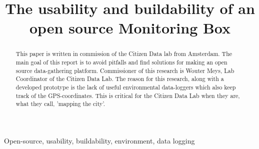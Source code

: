 \documentclass[conference]{IEEEtran}
\begin{document}
\title{The usability and buildability of an open source Monitoring Box}

\author{
	\and
		\and
		}
\maketitle	

\begin{abstract}
This paper is written in commission of the Citizen Data lab from Amsterdam. The main goal of this report is to avoid pitfalls and find solutions for making an open source data-gathering platform. Commissioner of this research is Wouter Meys, Lab Coordinator of the Citizen Data Lab. The reason for this research, along with a developed prototype is the lack of useful environmental data-loggers which also keep track of the GPS-coordinates. This is critical for the Citizen Data Lab when they are, what they call, 'mapping the city'. \\

\end{abstract}

\begin{IEEEkeywords}
Open-source, usability, buildability, environment, data logging
\end{IEEEkeywords}
\end{document}
